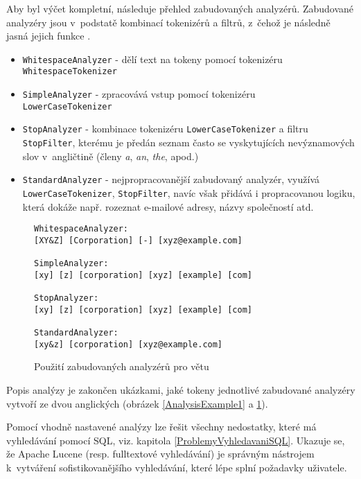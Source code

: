 \documentclass[11pt,oneside]{fithesis2}
\begin{document}
Aby byl výčet kompletní, následuje přehled zabudovaných analyzérů. Zabudované analyzéry jsou v~podstatě kombinací tokenizérů a filtrů, z~čehož je následně jasná jejich funkce  \cite[s.~112]{LuceneAction}.

\begin{itemize}
	\item \texttt{WhitespaceAnalyzer} - dělí text na tokeny pomocí tokenizéru \\ \texttt{WhitespaceTokenizer}
	\item \texttt{SimpleAnalyzer} - zpracovává vstup pomocí tokenizéru \\ \texttt{LowerCaseTokenizer}
	\item \texttt{StopAnalyzer} - kombinace tokenizéru \texttt{LowerCaseTokenizer} a filtru \texttt{StopFilter}, kterému je předán seznam často se vyskytujících nevýznamových slov v~angličtině (členy \emph{a}, \emph{an}, \emph{the}, apod.)
	\item \texttt{StandardAnalyzer} - nejpropracovanější zabudovaný analyzér, využívá \texttt{LowerCaseTokenizer}, \texttt{StopFilter}, navíc však přidává i propracovanou logiku, která dokáže např. rozeznat e-mailové adresy, názvy společností atd.
\end{itemize}

\begin{figure}[h!]
\begin{lstlisting}[frame=single]
WhitespaceAnalyzer:
[XY&Z] [Corporation] [-] [xyz@example.com]

SimpleAnalyzer:
[xy] [z] [corporation] [xyz] [example] [com]

StopAnalyzer:
[xy] [z] [corporation] [xyz] [example] [com]

StandardAnalyzer:
[xy&z] [corporation] [xyz@example.com]
\end{lstlisting}
\caption{Použití zabudovaných analyzérů pro větu \emph{}}
\label{AnalysisExample2}
\end{figure}

Popis analýzy je zakončen ukázkami, jaké tokeny jednotlivé zabudované analyzéry vytvoří ze dvou anglických (obrázek \ref{AnalysisExample1} a \ref{AnalysisExample2}).

Pomocí vhodně nastavené analýzy lze řešit všechny nedostatky, které má vyhledávání pomocí SQL, viz. kapitola \ref{ProblemyVyhledavaniSQL}. Ukazuje se, že Apache Lucene (resp. fulltextové vyhledávání) je správným nástrojem k~vytváření sofistikovanějšího vyhledávání, které lépe splní požadavky uživatele.
\end{document}
